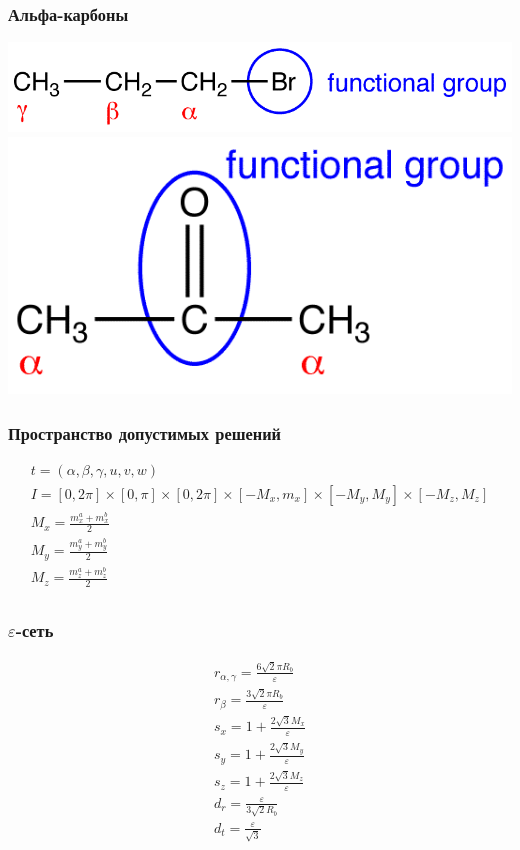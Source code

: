 \documentclass{beamer}
\newcommand{\eps}{\varepsilon}
\begin{document}
\begin{frame}
\frametitle{Альфа-карбоны}
\begin{center}
\includegraphics[scale=1.4]{../pictures/pic4.png}
\vfill
\includegraphics[scale=1.4]{../pictures/pic5.png}
\end{center}
\end{frame}

\begin{frame}
\frametitle{Пространство допустимых решений}
\begin{center}
\begin{gather*}
t = (\alpha, \beta, \gamma, u, v, w)\\
I = [0, 2\pi] \times [0, \pi] \times [0, 2\pi] \times [-M_x, m_x] \times [-M_y, M_y] \times [-M_z, M_z]\\
M_x = \frac{m_x^a + m_x^b}{2}\\
M_y = \frac{m_y^a + m_y^b}{2}\\
M_z = \frac{m_z^a + m_z^b}{2}\\
\end{gather*}
\end{center}
\end{frame}

\begin{frame}
\frametitle{$\eps$-сеть}
\begin{center}
\begin{gather*}
r_{\alpha, \gamma} =  \frac{6\sqrt{2}\pi R_b}{\eps}\\
r_{\beta} =  \frac{3\sqrt{2}\pi R_b}{\eps}\\
s_x = 1 + \frac{2\sqrt{3}M_x}{\eps}\\
s_y = 1 + \frac{2\sqrt{3}M_y}{\eps}\\
s_z = 1 + \frac{2\sqrt{3}M_z}{\eps}\\
d_r = \frac{\eps}{3\sqrt{2}R_b}\\
d_t = \frac{\eps}{\sqrt{3}}\\
\end{gather*}
\end{center}
\end{frame}
\end{document}

